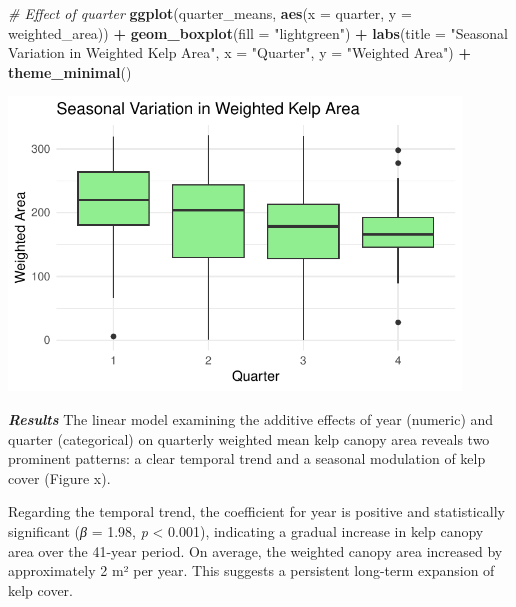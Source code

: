 \documentclass[
  british,
  10pt,
]{article}
\newenvironment{Shaded}{\begin{snugshade}}{\end{snugshade}}
\newcommand{\AttributeTok}[1]{\textcolor[rgb]{0.13,0.29,0.53}{#1}}
\newcommand{\CommentTok}[1]{\textcolor[rgb]{0.56,0.35,0.01}{\textit{#1}}}
\newcommand{\FunctionTok}[1]{\textcolor[rgb]{0.13,0.29,0.53}{\textbf{#1}}}
\newcommand{\NormalTok}[1]{#1}
\newcommand{\SpecialCharTok}[1]{\textcolor[rgb]{0.81,0.36,0.00}{\textbf{#1}}}
\newcommand{\StringTok}[1]{\textcolor[rgb]{0.31,0.60,0.02}{#1}}
\begin{document}
\begin{Shaded}
\begin{Highlighting}[]
\CommentTok{\# Effect of quarter}
\FunctionTok{ggplot}\NormalTok{(quarter\_means, }\FunctionTok{aes}\NormalTok{(}\AttributeTok{x =}\NormalTok{ quarter, }\AttributeTok{y =}\NormalTok{ weighted\_area)) }\SpecialCharTok{+}
  \FunctionTok{geom\_boxplot}\NormalTok{(}\AttributeTok{fill =} \StringTok{"lightgreen"}\NormalTok{) }\SpecialCharTok{+}
  \FunctionTok{labs}\NormalTok{(}\AttributeTok{title =} \StringTok{"Seasonal Variation in Weighted Kelp Area"}\NormalTok{, }\AttributeTok{x =} \StringTok{"Quarter"}\NormalTok{, }\AttributeTok{y =} \StringTok{"Weighted Area"}\NormalTok{) }\SpecialCharTok{+}
  \FunctionTok{theme\_minimal}\NormalTok{()}
\end{Highlighting}
\end{Shaded}

\begin{center}
\includegraphics[width=12cm,height=\textheight,keepaspectratio]{BCB744_Biostats_Prac_Exam_2025_files/figure-pdf/chunk13-2.pdf}
\end{center}

\textbf{\emph{Results}} The linear model examining the additive effects
of year (numeric) and quarter (categorical) on quarterly weighted mean
kelp canopy area reveals two prominent patterns: a clear temporal trend
and a seasonal modulation of kelp cover (Figure x).

Regarding the temporal trend, the coefficient for year is positive and
statistically significant (\emph{β} = 1.98, \emph{p} \textless{} 0.001),
indicating a gradual increase in kelp canopy area over the 41-year
period. On average, the weighted canopy area increased by approximately
2 m² per year. This suggests a persistent long-term expansion of kelp
cover.
\end{document}
